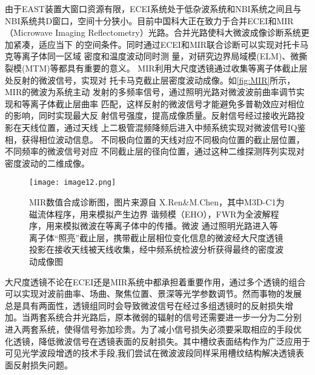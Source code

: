 由于EAST装置大窗口资源有限，ECEI系统处于低杂波系统和NBI系统之间且与NBI系统共D窗口，空间十分狭小。目前中国科大正在致力于合并ECEI和MIR（Microwave Imaging  
Reflectometry）光路。合并光路使科大微波成像诊断系统更加紧凑，适应当下
的空间条件。同时通过ECEI和MIR联合诊断可以实现对托卡马克等离子体同一区域
密度和温度波动同时测
量，对研究边界局域模(ELM)、微撕裂模(MTM)等都具有重要的意义。
MIR利用大尺度透镜通过收集等离子体截止层处反射的微波信号，实现对
托卡马克截止层密度波动成像\cite{mazzucato2001microwave}。如\autoref{fig:MIR}所示，MIR的微波为系统主动
发射的多频率信号，通过照明光路对微波波前曲率调节实现和等离子体截止层曲率
匹配，这样反射的微波信号才能避免多普勒效应对相位的影响，同时实现最大反
射信号强度，提高成像质量。反射信号经过接收光路投影在天线位置，通过天线
上二极管混频降频后进入中频系统实现对微波信号IQ鉴相，获得相位波动信息。
不同极向位置的天线对应不同极向位置的截止层位置，不同频率的微波信号对应
不同截止层的径向位置，通过这种二维探测阵列实现对密度波动的二维成像。
\begin{figure}[ht]
\centering
\texttt{[image: image12.png]}
\caption{\label{fig:MIR}MIR数值合成诊断图，图片来源自
X.Ren\&M.Chen\cite{RN1190}，其中M3D-C1为磁流体程序，用来模拟产生边界
谐频模（EHO），FWR为全波解程序，用来模拟微波在等离子体中的传播。微波
通过照明光路进入等离子体“照亮”截止层，携带截止层相位变化信息的微波经大尺度透镜投影在接收天线被天线收集，经中频系统检波分析获得最终的密度波动成像图}
\end{figure}
\par 
大尺度透镜不论在ECEI还是MIR系统中都承担着重要作用，通过多个透镜的组合
可以实现对波前曲率、场曲、聚焦位置、景深等光学参数调节。然而事物的发展
总是具有两面性，透镜组同时会导致微波信号在经过多组透镜时的反射损失增
加。当两套系统合并光路后，原本微弱的辐射的信号还需要进一步一分为二分别
进入两套系统，使得信号弥加珍贵。为了减小信号损失必须要采取相应的手段优
化透镜，降低微波信号在透镜表面的反射损失。其中槽纹表面结构作为广泛应用于可见光学波段增透的技术手段\cite{savin2015black},我们尝试在微波波段同样采用槽纹结构解决透镜表面反射损失问题。
